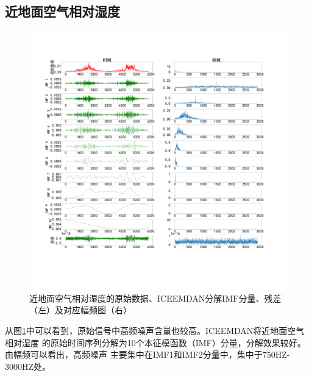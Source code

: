 \documentclass[AutoFakeBold]{LZUThesis}
\begin{document}
\subsection{近地面空气相对湿度}
\begin{figure}[H]
	\centering
    \includegraphics[width=1\textwidth]{figures/shum.pdf}
    \caption{近地面空气相对湿度的原始数据、ICEEMDAN分解IMF分量、残差（左）及对应幅频图（右）}
    \label{fig_shum}
\end{figure}

从图\ref{fig_shum}中可以看到，原始信号中高频噪声含量也较高。ICEEMDAN将近地面空气相对湿度
的原始时间序列分解为10个本征模函数（IMF）分量，分解效果较好。由幅频可以看出，高频噪声
主要集中在IMF1和IMF2分量中，集中于750HZ-3000HZ处。
\end{document}
